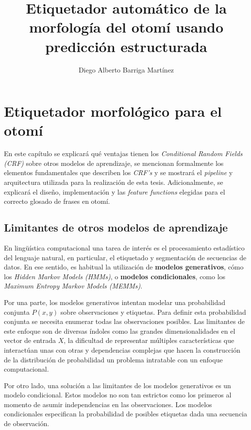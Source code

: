 \documentclass[letterpaper,12pt,oneside]{book}
\begin{document}

\author{Diego Alberto Barriga Martínez}
\title{Etiquetador automático de la morfología del otomí usando predicción estructurada}
\tableofcontents
\maketitle

\chapter{Etiquetador morfológico para el otomí}

En este capítulo se explicará qué ventajas tienen los \emph{Conditional Random Fields (CRF)} sobre otros modelos de aprendizaje, se mencionan formalmente los elementos fundamentales que describen los \emph{CRF's} y se mostrará el \textit{pipeline} y arquitectura utilizada para la realización de esta tesis. Adicionalmente, se explicará el diseño, implementación y las \textit{feature functions} elegidas para el correcto glosado de frases en otomí.

\section{Limitantes de otros modelos de aprendizaje}

En lingüística computacional una tarea de interés es el procesamiento estadístico del lenguaje natural, en particular, el etiquetado y segmentación de secuencias de datos. En ese sentido, es habitual la utilización de \textbf{modelos generativos}, cómo los \textit{Hidden Markov Models (HMMs)}, o \textbf{modelos condicionales}, como los \textit{Maximum Entropy Markov Models (MEMMs)}.

Por una parte, los modelos generativos intentan modelar una probabilidad conjunta $P(x,y)$ sobre observaciones y etiquetas. Para definir esta probabilidad conjunta se necesita enumerar todas las observaciones posibles. Las limitantes de este enfoque son de diversas índoles como las grandes dimensionalidades en el vector de entrada $X$, la dificultad de representar múltiples características que interactúan unas con otras y dependencias complejas que hacen la construcción de la distribución de probabilidad un problema intratable con un enfoque computacional.

Por otro lado, una solución a las limitantes de los modelos generativos es un modelo condicional. Estos modelos no son tan estrictos como los primeros al momento de asumir independencias en las observaciones. Los modelos condicionales especifican la probabilidad de posibles etiquetas dada una secuencia de observación.
\end{document}
